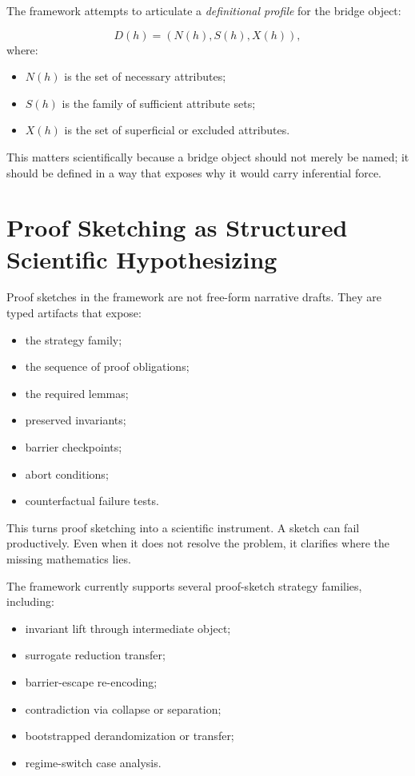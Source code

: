 \documentclass[11pt]{article}
\begin{document}
The framework attempts to articulate a \emph{definitional profile} for the bridge object:

\[
D(h) = (N(h), S(h), X(h)),
\]
where:
\begin{itemize}[leftmargin=*,itemsep=0.2em]
\item $N(h)$ is the set of necessary attributes;
\item $S(h)$ is the family of sufficient attribute sets;
\item $X(h)$ is the set of superficial or excluded attributes.
\end{itemize}

This matters scientifically because a bridge object should not merely be named; it should be defined in a way that exposes why it would carry inferential force.

\section{Proof Sketching as Structured Scientific Hypothesizing}

Proof sketches in the framework are not free-form narrative drafts. They are typed artifacts that expose:

\begin{itemize}[leftmargin=*,itemsep=0.2em]
\item the strategy family;
\item the sequence of proof obligations;
\item the required lemmas;
\item preserved invariants;
\item barrier checkpoints;
\item abort conditions;
\item counterfactual failure tests.
\end{itemize}

This turns proof sketching into a scientific instrument. A sketch can fail productively. Even when it does not resolve the problem, it clarifies where the missing mathematics lies.

The framework currently supports several proof-sketch strategy families, including:

\begin{itemize}[leftmargin=*,itemsep=0.2em]
\item invariant lift through intermediate object;
\item surrogate reduction transfer;
\item barrier-escape re-encoding;
\item contradiction via collapse or separation;
\item bootstrapped derandomization or transfer;
\item regime-switch case analysis.
\end{itemize}
\end{document}
